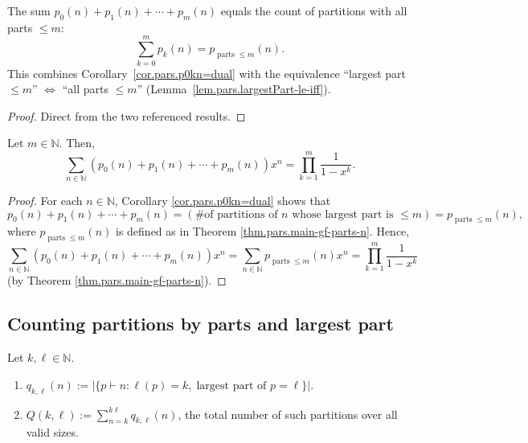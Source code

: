 \begin{lemma}
\label{lem.pars.partsCount-sum-eq-partsLeqCount}
\leanhelper
\leanok
The sum $p_0(n) + p_1(n) + \cdots + p_m(n)$ equals the count of partitions
with all parts $\leq m$:
\[
\sum_{k=0}^{m} p_k(n) = p_{\operatorname{parts}\leq m}(n).
\]
This combines Corollary~\ref{cor.pars.p0kn=dual} with the equivalence
``largest part $\leq m$'' $\iff$ ``all parts $\leq m$''
(Lemma~\ref{lem.pars.largestPart-le-iff}).
\end{lemma}

\begin{proof}
Direct from the two referenced results.
\end{proof}

\begin{theorem}
\label{thm.pars.main-gf-0n}
\leantarget
\leanok
Let $m\in\mathbb{N}$. Then,%
\[
\sum_{n\in\mathbb{N}}\left(  p_{0}\left(  n\right)  +p_{1}\left(  n\right)
+\cdots+p_{m}\left(  n\right)  \right)  x^{n}=\prod_{k=1}^{m}\dfrac{1}%
{1-x^{k}}.
\]
\end{theorem}

\begin{proof}
For each $n\in\mathbb{N}$, Corollary
\ref{cor.pars.p0kn=dual} shows that%
\[
p_{0}\left(  n\right)  +p_{1}\left(  n\right)  +\cdots+p_{m}\left(
n\right)
=\left(  \text{\# of partitions of }n\text{ whose largest part is }\leq
m\right)
=p_{\operatorname{parts}\leq m}\left(  n\right)  ,
\]
where $p_{\operatorname{parts}\leq m}\left(  n\right)  $ is defined as in
Theorem \ref{thm.pars.main-gf-parts-n}. Hence,%
\[
\sum_{n\in\mathbb{N}}\left(  p_{0}\left(  n\right)  +p_{1}\left(
n\right)  +\cdots+p_{m}\left(  n\right)  \right)  x^{n}=\sum_{n\in\mathbb{N}}p_{\operatorname{parts}%
\leq m}\left(  n\right)  x^{n}=\prod_{k=1}^{m}\dfrac{1}{1-x^{k}}
\]
(by Theorem \ref{thm.pars.main-gf-parts-n}).
\end{proof}

\subsection{Counting partitions by parts and largest part}

\begin{definition}
\label{def.pars.partsAndLargestCount}
\leanhelper
\leanok
Let $k,\ell\in\mathbb{N}$.
\begin{enumerate}
\item $q_{k,\ell}(n) := |\{p \vdash n : \ell(p) = k,\;\text{largest part of }p = \ell\}|$.
\item $Q(k,\ell) := \sum_{n=k}^{k\ell} q_{k,\ell}(n)$, the total number of such partitions over all valid sizes.
\end{enumerate}
\end{definition}

